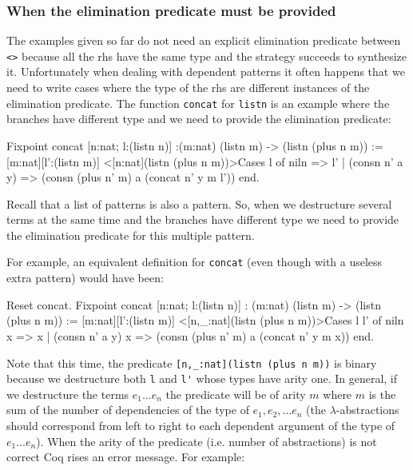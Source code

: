 \subsubsection{When the elimination predicate must be provided}
The examples  given so far do not need an explicit elimination predicate
between \verb+<>+ because all the rhs have the same type and the
strategy succeeds to synthesize it.
Unfortunately when dealing with dependent patterns it often happens
that we need to write cases where the type of the rhs are 
different  instances of the elimination  predicate.
The function  \verb+concat+ for \verb+listn+
is an example where the branches have different type
and we need to provide the elimination predicate:

\begin{coq_example}
Fixpoint concat [n:nat; l:(listn n)] :(m:nat) (listn m) -> (listn (plus n m))
 := [m:nat][l':(listn m)] 
       <[n:nat](listn (plus n m))>Cases l  of 
           niln          => l'
        | (consn n' a y) => (consn (plus n' m) a (concat n' y m l'))
        end.
\end{coq_example}

Recall that a list of patterns is also a pattern. So, when
we destructure several terms at the same time and the branches have
different type  we need to provide
the elimination predicate for this multiple pattern.

For example, an equivalent definition for \verb+concat+ (even though with a useless extra pattern) would have
been:

\begin{coq_example}
Reset concat.
Fixpoint concat [n:nat; l:(listn n)] : (m:nat) (listn m) -> (listn (plus n m)) 
:= [m:nat][l':(listn m)] 
    <[n,_:nat](listn (plus n m))>Cases l l' of 
                     niln          x => x
                  | (consn n' a y) x => (consn (plus n' m) a (concat n' y m x))
                  end.
\end{coq_example}

Note that this time, the predicate \verb+[n,_:nat](listn (plus n m))+ is binary because we
destructure both \verb+l+ and \verb+l'+ whose types have arity one.
In general, if we destructure the terms $e_1\ldots e_n$
the predicate will be of arity $m$ where $m$ is the sum of the
number of dependencies of the type of $e_1, e_2,\ldots e_n$ (the $\lambda$-abstractions
should correspond from left to right to each dependent argument of the
type of $e_1\ldots e_n$).
When the arity of the predicate (i.e. number of abstractions) is not
correct Coq rises an error message. For example:

